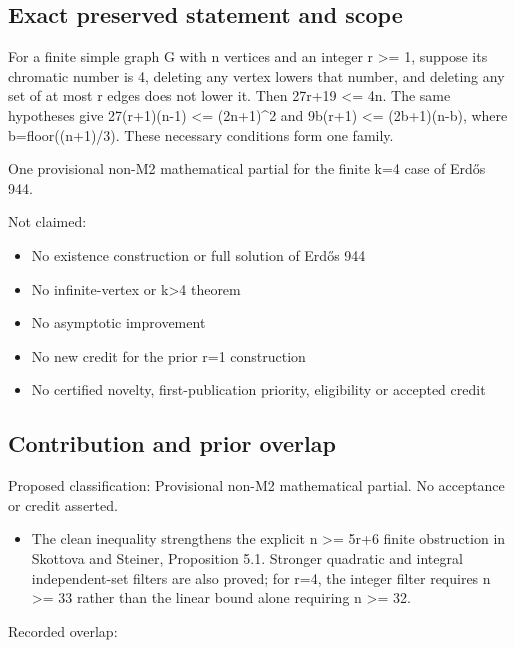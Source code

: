 \documentclass[11pt,a4paper]{article}
\begin{document}
\subsection{Exact preserved statement and scope}
For a finite simple graph G with n vertices and an integer r >= 1, suppose its chromatic number is 4, deleting any vertex lowers that number, and deleting any set of at most r edges does not lower it. Then 27r+19 <= 4n. The same hypotheses give 27(r+1)(n-1) <= (2n+1)\textasciicircum{}2 and 9b(r+1) <= (2b+1)(n-b), where b=floor((n+1)/3). These necessary conditions form one family.

One provisional non-M2 mathematical partial for the finite k=4 case of Erdős 944.

Not claimed:

\begin{itemize}
\item No existence construction or full solution of Erdős 944
\end{itemize}
\begin{itemize}
\item No infinite-vertex or k>4 theorem
\end{itemize}
\begin{itemize}
\item No asymptotic improvement
\end{itemize}
\begin{itemize}
\item No new credit for the prior r=1 construction
\end{itemize}
\begin{itemize}
\item No certified novelty, first-publication priority, eligibility or accepted credit
\end{itemize}
\subsection{Contribution and prior overlap}
Proposed classification: Provisional non-M2 mathematical partial. No acceptance or credit asserted.

\begin{itemize}
\item The clean inequality strengthens the explicit n >= 5r+6 finite obstruction in Skottova and Steiner, Proposition 5.1. Stronger quadratic and integral independent-set filters are also proved; for r=4, the integer filter requires n >= 33 rather than the linear bound alone requiring n >= 32.
\end{itemize}
Recorded overlap:
\end{document}
